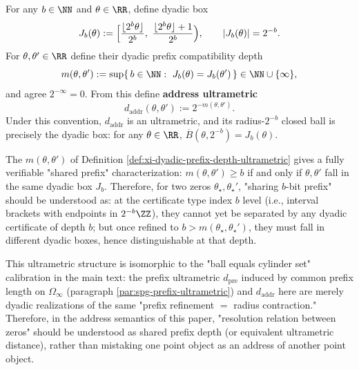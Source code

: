 \begin{definition}\label{def:xi-dyadic-prefix-depth-ultrametric}
For any \(b\in\NN\) and \(\theta\in\RR\), define dyadic box
\[
J_b(\theta):=\Bigl[\frac{\lfloor 2^b\theta\rfloor}{2^b},\ \frac{\lfloor 2^b\theta\rfloor+1}{2^b}\Bigr),
\qquad |J_b(\theta)|=2^{-b}.
\]
For \(\theta,\theta'\in\RR\) define their dyadic prefix compatibility depth
\[
m(\theta,\theta'):=\sup\{\,b\in\NN:\ J_b(\theta)=J_b(\theta')\,\}\in\NN\cup\{\infty\},
\]
and agree \(2^{-\infty}=0\).
From this define \textbf{address ultrametric}
\[
d_{\mathrm{addr}}(\theta,\theta'):=2^{-m(\theta,\theta')}.
\]
Under this convention, \(d_{\mathrm{addr}}\) is an ultrametric, and its radius-\(2^{-b}\) closed ball is precisely the dyadic box: for any \(\theta\in\RR\),
\(
\overline{B}(\theta,2^{-b})=J_b(\theta)
\).
\end{definition}

\begin{remark}\label{rem:xi-shared-prefix-cert-depth}
The \(m(\theta,\theta')\) of Definition \ref{def:xi-dyadic-prefix-depth-ultrametric} gives a fully verifiable "shared prefix" characterization: \(m(\theta,\theta')\ge b\) if and only if \(\theta,\theta'\) fall in the same dyadic box \(J_b\).
Therefore, for two zeros \(\theta_\star,\theta_\star'\), "sharing \(b\)-bit prefix" should be understood as: at the certificate type index \(b\) level (i.e., interval brackets with endpoints in \(2^{-b}\ZZ\)), they cannot yet be separated by any dyadic certificate of depth \(b\); but once refined to \(b>m(\theta_\star,\theta_\star')\), they must fall in different dyadic boxes, hence distinguishable at that depth.
\par
This ultrametric structure is isomorphic to the "ball equals cylinder set" calibration in the main text: the prefix ultrametric \(d_{\mathrm{pre}}\) induced by common prefix length on \(\Omega_\infty\) (paragraph \ref{par:spg-prefix-ultrametric}) and \(d_{\mathrm{addr}}\) here are merely dyadic realizations of the same "prefix refinement \(=\) radius contraction."
Therefore, in the address semantics of this paper, "resolution relation between zeros" should be understood as shared prefix depth (or equivalent ultrametric distance), rather than mistaking one point object as an address of another point object.
\end{remark}

